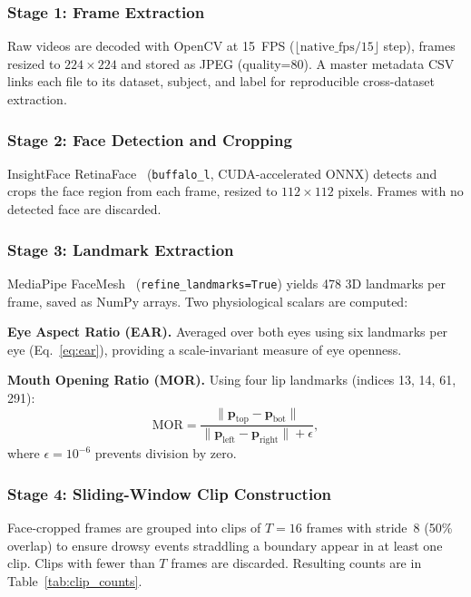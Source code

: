 \documentclass[journal]{IEEEtran}
\begin{document}
\subsubsection{Stage 1: Frame Extraction}
Raw videos are decoded with OpenCV at 15~FPS ($\lfloor\text{native\_fps}/15\rfloor$ step), frames resized to $224\times224$ and stored as JPEG (quality=80). A master metadata CSV links each file to its dataset, subject, and label for reproducible cross-dataset extraction.

\subsubsection{Stage 2: Face Detection and Cropping}
InsightFace RetinaFace~\cite{insightface2022} (\texttt{buffalo\_l}, CUDA-accelerated ONNX) detects and crops the face region from each frame, resized to $112\times112$ pixels. Frames with no detected face are discarded.

\subsubsection{Stage 3: Landmark Extraction}
MediaPipe FaceMesh~\cite{mediapipe2019} (\texttt{refine\_landmarks=True}) yields 478 3D landmarks per frame, saved as NumPy arrays. Two physiological scalars are computed:

\textbf{Eye Aspect Ratio (EAR).} Averaged over both eyes using six landmarks per eye (Eq.~\eqref{eq:ear}), providing a scale-invariant measure of eye openness.

\textbf{Mouth Opening Ratio (MOR).} Using four lip landmarks (indices 13, 14, 61, 291):
\begin{equation}
\text{MOR} = \frac{\|\mathbf{p}_{\text{top}} - \mathbf{p}_{\text{bot}}\|}{\|\mathbf{p}_{\text{left}} - \mathbf{p}_{\text{right}}\| + \epsilon},
\label{eq:mor}
\end{equation}
where $\epsilon=10^{-6}$ prevents division by zero.

\subsubsection{Stage 4: Sliding-Window Clip Construction}
Face-cropped frames are grouped into clips of $T{=}16$ frames with stride~8 (50\% overlap) to ensure drowsy events straddling a boundary appear in at least one clip. Clips with fewer than $T$ frames are discarded. Resulting counts are in Table~\ref{tab:clip_counts}.
\end{document}
